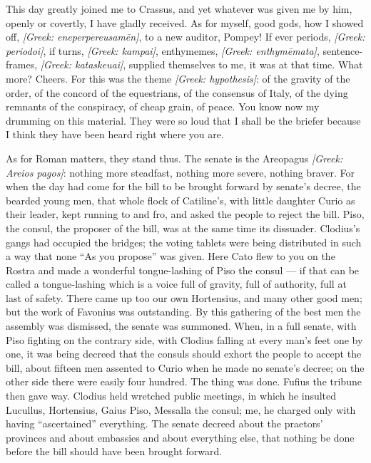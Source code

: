  This day greatly joined me to Crassus, and yet whatever was given me by him, openly or covertly, I have gladly received. As for myself, good gods, how I showed off, \textit{[Greek: eneperpereusam\=en]}, to a new auditor, Pompey! If ever periods, \textit{[Greek: periodoi]}, if turns, \textit{[Greek: kampai]}, enthymemes, \textit{[Greek: enthym\=emata]}, sentence-frames, \textit{[Greek: kataskeuai]}, supplied themselves to me, it was at that time. What more? Cheers. For this was the theme \textit{[Greek: hypothesis]}: of the gravity of the order, of the concord of the equestrians, of the consensus of Italy, of the dying remnants of the conspiracy, of cheap grain, of peace. You know now my drumming on this material. They were so loud that I shall be the briefer because I think they have been heard right where you are.

 As for Roman matters, they stand thus. The senate is the Areopagus \textit{[Greek: Areios pagos]}: nothing more steadfast, nothing more severe, nothing braver. For when the day had come for the bill to be brought forward by senate's decree, the bearded young men, that whole flock of Catiline's, with little daughter Curio as their leader, kept running to and fro, and asked the people to reject the bill. Piso, the consul, the proposer of the bill, was at the same time its dissuader. Clodius's gangs had occupied the bridges; the voting tablets were being distributed in such a way that none ``As you propose'' was given. Here Cato flew to you on the Rostra and made a wonderful tongue-lashing of Piso the consul --- if that can be called a tongue-lashing which is a voice full of gravity, full of authority, full at last of safety. There came up too our own Hortensius, and many other good men; but the work of Favonius was outstanding. By this gathering of the best men the assembly was dismissed, the senate was summoned. When, in a full senate, with Piso fighting on the contrary side, with Clodius falling at every man's feet one by one, it was being decreed that the consuls should exhort the people to accept the bill, about fifteen men assented to Curio when he made no senate's decree; on the other side there were easily four hundred. The thing was done. Fufius the tribune then gave way. Clodius held wretched public meetings, in which he insulted Lucullus, Hortensius, Gaius Piso, Messalla the consul; me, he charged only with having ``ascertained'' everything. The senate decreed about the praetors' provinces and about embassies and about everything else, that nothing be done before the bill should have been brought forward.


